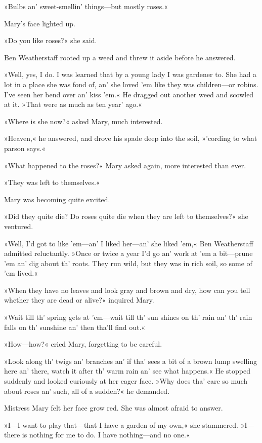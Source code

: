 »Bulbs an' sweet-smellin' things—but mostly roses.«

Mary's face lighted up.

»Do you like roses?« she said.

Ben Weatherstaff rooted up a weed and threw it aside before he answered.

»Well, yes, I do. I was learned that by a young lady I was gardener to. She had a lot in a place she was fond of, an' she loved 'em like they was children—or robins. I've seen her bend over an' kiss 'em.« He dragged out another weed and scowled at it. »That were as much as ten year' ago.«

»Where is she now?« asked Mary, much interested.

»Heaven,« he answered, and drove his spade deep into the soil, »'cording to what parson says.«

»What happened to the roses?« Mary asked again, more interested than ever.

»They was left to themselves.«

Mary was becoming quite excited.

»Did they quite die? Do roses quite die when they are left to themselves?« she ventured.

»Well, I'd got to like 'em—an' I liked her—an' she liked 'em,« Ben Weatherstaff admitted reluctantly. »Once or twice a year I'd go an' work at 'em a bit—prune 'em an' dig about th' roots. They run wild, but they was in rich soil, so some of 'em lived.«

»When they have no leaves and look gray and brown and dry, how can you tell whether they are dead or alive?« inquired Mary.

»Wait till th' spring gets at 'em—wait till th' sun shines on th' rain an' th' rain falls on th' sunshine an' then tha'll find out.«

»How—how?« cried Mary, forgetting to be careful.

»Look along th' twigs an' branches an' if tha' sees a bit of a brown lump swelling here an' there, watch it after th' warm rain an' see what happens.« He stopped suddenly and looked curiously at her eager face. »Why does tha' care so much about roses an' such, all of a sudden?« he demanded.

Mistress Mary felt her face grow red. She was almost afraid to answer.

»I—I want to play that—that I have a garden of my own,« she stammered. »I—there is nothing for me to do. I have nothing—and no one.«

